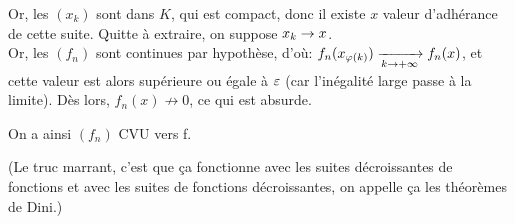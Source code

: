 \documentclass[a4paper, 12pt]{article}
\begin{document}
\begin{enumerate}[a)]
\begin{corr}
			Or, les $(x_k)$ sont dans $K$, qui est compact, donc il existe $x$ valeur d'adhérance de cette suite. Quitte à extraire, on suppose $x_k \cv x$. \\
			
			Or, les $(f_n)$ sont continues par hypothèse, d'où: $f_n(x_{\vphi(k)}) \cv[k\rightarrow +\infty] f_n(x)$, et cette valeur est alors supérieure ou égale à $\varepsilon$ (car l'inégalité large passe à la limite). Dès lors, $f_n(x) \not \rightarrow 0$, ce qui est absurde.
			
			On a ainsi $(f_n)$ CVU vers f.
			
			(Le truc marrant, c'est que ça fonctionne avec les suites décroissantes de fonctions et avec les suites de fonctions décroissantes, on appelle ça les théorèmes de Dini.)
		\end{corr}
	\end{enumerate}
	
\end{document}
